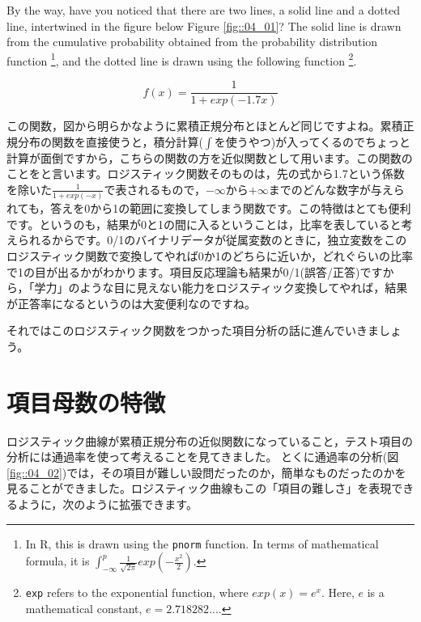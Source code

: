 \documentclass{ltjsbook}
\begin{document}
By the way, have you noticed that there are two lines, a solid line and a dotted line, intertwined in the figure below Figure \ref{fig::04_01}? The solid line is drawn from the cumulative probability obtained from the probability distribution function \footnote{In R, this is drawn using the \texttt{pnorm} function. In terms of mathematical formula, it is $\int_{-\infty}^p \frac{1}{\sqrt{2\pi}}exp(-\frac{x^2}{2})$.}, and the dotted line is drawn using the following function \footnote{\texttt{exp} refers to the exponential function, where $exp(x)= e^x$. Here, $e$ is a mathematical constant, $e=2.718282...$.}.

\[ f(x) = \frac{1}{1+exp(-1.7x)} \]

この関数，図から明らかなように累積正規分布とほとんど同じですよね。累積正規分布の関数を直接使うと，積分計算($\int$を使うやつ)が入ってくるのでちょっと計算が面倒ですから，こちらの関数の方を近似関数として用います。この関数のことをと言います。ロジスティック関数そのものは，先の式から1.7という係数を除いた$\frac{1}{1+exp(-x)}$で表されるもので，$-\infty$から$+\infty$までのどんな数字が与えられても，答えを0から1の範囲に変換してしまう関数です。この特徴はとても便利です。というのも，結果が0と1の間に入るということは，比率を表していると考えられるからです。0/1のバイナリデータが従属変数のときに，独立変数をこのロジスティック関数で変換してやれば0か1のどちらに近いか，どれぐらいの比率で1の目が出るかがわかります。項目反応理論も結果が0/1(誤答/正答)ですから，「学力」のような目に見えない能力をロジスティック変換してやれば，結果が正答率になるというのは大変便利なのですね。

それではこのロジスティック関数をつかった項目分析の話に進んでいきましょう。

\section{項目母数の特徴}
ロジスティック曲線が累積正規分布の近似関数になっていること，テスト項目の分析には通過率を使って考えることを見てきました。
とくに通過率の分析(図\ref{fig::04_02})では，その項目が難しい設問だったのか，簡単なものだったのかを見ることができました。ロジスティック曲線もこの「項目の難しさ」を表現できるように，次のように拡張できます。
\end{document}
